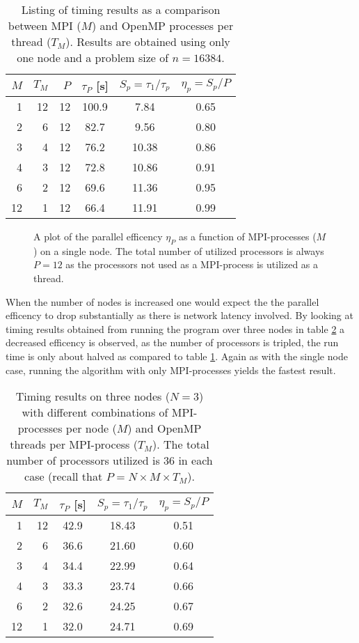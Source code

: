 \documentclass[11pt,a4paper,english]{article}
\numberwithin{figure}{subsection}
\numberwithin{table}{subsection}
\begin{document}
\begin{table}[htbp]
	\label{tab:MPIspeedup}
	\caption{Listing of timing results as a comparison between MPI ($M$) and OpenMP processes per thread ($T_M$). Results are obtained using only one node and a problem size of $n=16384$.}
	\centering
	\begin{tabular}{r|r|r|c|c|c}
	$M$	&	$T_M$	&	$P$	&	$\tau_P$ [s] & $S_p=\tau_1/\tau_p$	&	$\eta_p=S_p/P$	\\
\hline
	1&	12&	12&	100.9&	7.84&	0.65\\
	2&	6&	12&	82.7&	9.56&	0.80\\
	3&	4&	12&	76.2&	10.38&	0.86\\
	4&	3&	12&	72.8&	10.86&	0.91\\
	6&	2&	12&	69.6&	11.36&	0.95\\
	12&	1&	12&	66.4&	11.91&	0.99\\
	\end{tabular}
\end{table}

\begin{figure}[htbp]
	\label{fig:MPIspeedup}
	\centering
	
	\caption{A plot of the parallel efficency $\eta_P$ as a function of MPI-processes ($M$) on a single node. The total number of utilized processors is always $P=12$ as the processors not used as a MPI-process is utilized as a thread.}
\end{figure}

When the number of nodes is increased one would expect the the parallel efficency to drop substantially as there is network latency involved. By looking at timing results obtained from running the program over three nodes in table \ref{tab:nodes} a decreased efficency is observed, as the number of processors is tripled, the run time is only about halved as compared to table \ref{tab:MPIspeedup}. Again as with the single node case, running the algorithm with only MPI-processes yields the fastest result.

\begin{table}[htbp]
	\label{tab:nodes}
	\caption{Timing results on three nodes ($N=3$) with different combinations of MPI-processes per node ($M$) and OpenMP threads per MPI-process ($T_M$). The total number of processors utilized is 36 in each case (recall that $P=N\times M\times T_M$).}
	\centering
	\begin{tabular}{r|r|c|c|c}
	$M$	&	$T_M$	&	$\tau_P$ [s] & $S_p=\tau_1/\tau_p$	&	$\eta_p=S_p/P$	\\
\hline
	1	&12	&42.9	&18.43	&0.51\\
	2	&6	&36.6	&21.60	&0.60\\
	3	&4	&34.4	&22.99	&0.64\\
	4	&3	&33.3	&23.74	&0.66\\
	6	&2	&32.6	&24.25	&0.67\\
	12	&1	&32.0	&24.71	&0.69\\
	\end{tabular}
\end{table}
\end{document}
